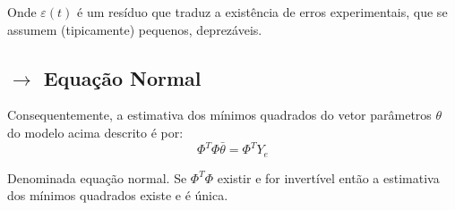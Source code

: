 \noindent Onde $\varepsilon(t)$ é um resíduo que traduz a existência de erros experimentais, que se assumem (tipicamente) pequenos, deprezáveis. 
\subsection[5.3 Equação Normal]{$\rightarrow$ Equação Normal}
Consequentemente, a estimativa dos mínimos quadrados do vetor parâmetros $\theta$ do modelo acima descrito é por:
$$
    \Phi^{T}\Phi\bar{\theta} =  \Phi^{T}Y_e
$$

\noindent Denominada equação normal. Se $\Phi^{T}\Phi$ existir e for invertível então a estimativa dos mínimos quadrados existe e é única.
